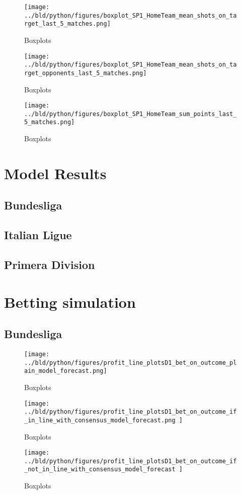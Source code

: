\documentclass[11pt, a4paper, leqno]{article}
\begin{document}
\begin{figure}[H]
    \centering
    \texttt{[image: ../bld/python/figures/boxplot\_SP1\_HomeTeam\_mean\_shots\_on\_target\_last\_5\_matches.png]}
    \caption{Boxplots}
    \label{fig:figure2}
\end{figure}

\begin{figure}[H]
    \centering
    \texttt{[image: ../bld/python/figures/boxplot\_SP1\_HomeTeam\_mean\_shots\_on\_target\_opponents\_last\_5\_matches.png]}
    \caption{Boxplots}
    \label{fig:figure2}
\end{figure}

\begin{figure}[H]
    \centering
    \texttt{[image: ../bld/python/figures/boxplot\_SP1\_HomeTeam\_sum\_points\_last\_5\_matches.png]}
    \caption{Boxplots}
    \label{fig:figure2}
\end{figure}



\section{Model Results}
\subsection{Bundesliga}
\subsection{Italian Ligue }
\subsection{Primera Division}
\section{Betting simulation}
\subsection{Bundesliga}
\begin{figure}[H]
    \centering
    \texttt{[image: ../bld/python/figures/profit\_line\_plotsD1\_bet\_on\_outcome\_plain\_model\_forecast.png]}
    \caption{Boxplots}
    \label{fig:figure2}
\end{figure}

\begin{figure}[H]
    \centering
    \texttt{[image: ../bld/python/figures/profit\_line\_plotsD1\_bet\_on\_outcome\_if\_in\_line\_with\_consensus\_model\_forecast.png
    ]}
    \caption{Boxplots}
    \label{fig:figure2}
\end{figure}
\begin{figure}[H]
    \centering
    \texttt{[image: ../bld/python/figures/profit\_line\_plotsD1\_bet\_on\_outcome\_if\_not\_in\_line\_with\_consensus\_model\_forecast
    ]}
    \caption{Boxplots}
    \label{fig:figure2}
\end{figure}
\end{document}
